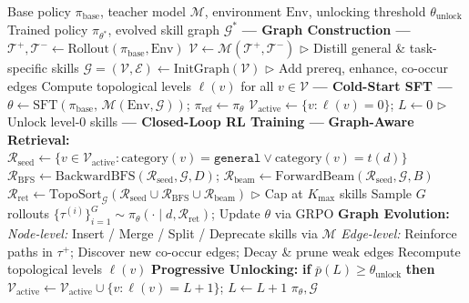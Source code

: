 \begin{algorithm}[t]
    \caption{\textsc{SkillGraph}: Skill-Augmented RL for Agents via Evolving Skill Graphs}
    \label{alg:skillgraph}
    \small
    \begin{algorithmic}[1]
    \REQUIRE Base policy $\pi_{\text{base}}$, teacher model $\mathcal{M}$, environment $\mathrm{Env}$, unlocking threshold $\theta_{\text{unlock}}$
    \ENSURE Trained policy $\pi_{\theta^*}$, evolved skill graph $\mathcal{G}^*$
    \STATE \textbf{--- Graph Construction ---}
    \STATE $\mathcal{T}^+, \mathcal{T}^- \leftarrow \text{Rollout}(\pi_{\text{base}}, \mathrm{Env})$
    \STATE $\mathcal{V} \leftarrow \mathcal{M}(\mathcal{T}^+, \mathcal{T}^-)$ \hfill $\triangleright$ Distill general \& task-specific skills
    \STATE $\mathcal{G}=(\mathcal{V},\mathcal{E}) \leftarrow \text{InitGraph}(\mathcal{V})$ \hfill $\triangleright$ Add prereq, enhance, co-occur edges
    \STATE Compute topological levels $\ell(v)$ for all $v \in \mathcal{V}$
    \STATE \textbf{--- Cold-Start SFT ---}
    \STATE $\theta \leftarrow \text{SFT}(\pi_{\text{base}},\, \mathcal{M}(\mathrm{Env}, \mathcal{G}))$; \quad $\pi_{\text{ref}} \leftarrow \pi_\theta$
    \STATE $\mathcal{V}_{\text{active}} \leftarrow \{v : \ell(v) = 0\}$; \quad $L \leftarrow 0$ \hfill $\triangleright$ Unlock level-0 skills
    \STATE \textbf{--- Closed-Loop RL Training ---}
            \STATE \textbf{Graph-Aware Retrieval:}
            \STATE \quad $\mathcal{R}_{\text{seed}} \leftarrow \{v \in \mathcal{V}_{\text{active}} : \mathrm{category}(v)=\texttt{general} \vee \mathrm{category}(v)=t(d)\}$
            \STATE \quad $\mathcal{R}_{\text{BFS}} \leftarrow \text{BackwardBFS}(\mathcal{R}_{\text{seed}}, \mathcal{G}, D)$; \quad $\mathcal{R}_{\text{beam}} \leftarrow \text{ForwardBeam}(\mathcal{R}_{\text{seed}}, \mathcal{G}, B)$
            \STATE \quad $\mathcal{R}_{\text{ret}} \leftarrow \text{TopoSort}_{\mathcal{G}}(\mathcal{R}_{\text{seed}} \cup \mathcal{R}_{\text{BFS}} \cup \mathcal{R}_{\text{beam}})$ \hfill $\triangleright$ Cap at $K_{\max}$ skills
            \STATE Sample $G$ rollouts $\{\tau^{(i)}\}_{i=1}^G \sim \pi_\theta(\cdot \mid d, \mathcal{R}_{\text{ret}})$; \quad Update $\theta$ via GRPO
        \ENDFOR
            \STATE \textbf{Graph Evolution:}
            \STATE \textit{Node-level:} Insert / Merge / Split / Deprecate skills via $\mathcal{M}$
            \STATE \textit{Edge-level:} Reinforce paths in $\tau^+$; Discover new co-occur edges; Decay \& prune weak edges
            \STATE Recompute topological levels $\ell(v)$
            \STATE \textbf{Progressive Unlocking:} \textbf{if} $\bar{p}(L) \geq \theta_{\text{unlock}}$ \textbf{then} $\mathcal{V}_{\text{active}} \leftarrow \mathcal{V}_{\text{active}} \cup \{v : \ell(v) = L{+}1\}$; $L \leftarrow L{+}1$
        \ENDIF
    \ENDFOR
    \RETURN $\pi_\theta, \mathcal{G}$
    \end{algorithmic}
    \end{algorithm}
\vspace{10pt}